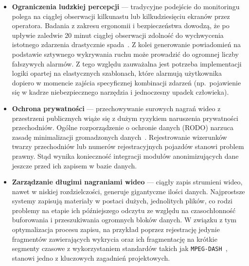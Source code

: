 \begin{itemize}
\item \textbf{Ograniczenia ludzkiej percepcji} --- tradycyjne podejście do monitoringu polega na ciągłej obserwacji kilkunastu lub kilkudziesięciu ekranów przez operatora. Badania z zakresu ergonomii i bezpieczeństwa dowodzą, że po upływie zaledwie 20 minut ciągłej obserwacji zdolność do wychwycenia istotnego zdarzenia drastycznie spada~\cite{human_factor_cctv}. Z kolei generowanie powiadomień na podstawie sztywnego wykrywania ruchu może prowadzić do ogromnej liczby fałszywych alarmów. Z tego względu zauważalna jest potrzeba implementacji logiki opartej na elastycznych szablonach, które alarmują użytkownika dopiero w momencie zajścia specyficznej kombinacji zdarzeń (np.\ pojawienie się w kadrze niebezpiecznego narzędzia i jednoczesny upadek człowieka).
\item \textbf{Ochrona prywatności} --- przechowywanie surowych nagrań wideo z przestrzeni publicznych wiąże się z dużym ryzykiem naruszenia prywatności przechodniów. Ogólne rozporządzenie o ochronie danych (RODO) narzuca zasadę minimalizacji gromadzonych danych~\cite{gdpr_video_surveillance}. Rejestrowanie wizerunków twarzy przechodniów lub numerów rejestracyjnych pojazdów stanowi problem prawny. Stąd wynika konieczność integracji modułów anonimizujących dane jeszcze przed ich zapisem w bazie danych.
\item \textbf{Zarządzanie długimi nagraniami wideo} --- ciągły zapis strumieni wideo, nawet w niskiej rozdzielczości, generuje gigantyczne ilości danych. Najprostsze systemy zapisują materiały w postaci dużych, jednolitych plików, co rodzi problemy na etapie ich późniejszego odczytu ze względu na czasochłonność buforowania i przeszukiwania ogromnych bloków danych. W związku z tym optymalizacja procesu zapisu, na przykład poprzez rejestrację jedynie fragmentów zawierających wykrycia oraz ich fragmentację na krótkie segmenty czasowe z wykorzystaniem standardów takich jak \texttt{MPEG-DASH}~\cite{dash_standard}, stanowi jedno z kluczowych zagadnień projektowych.
\end{itemize}